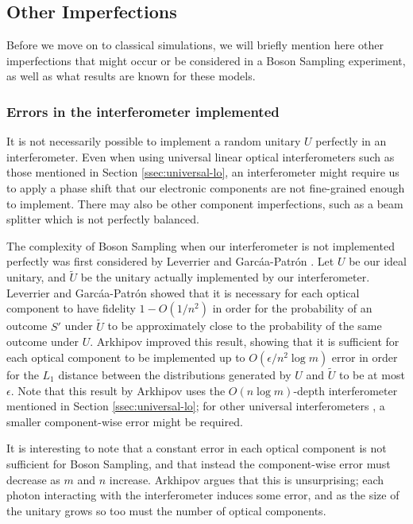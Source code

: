 \subsection{Other Imperfections}

Before we move on to classical simulations, we will briefly mention here other imperfections that might occur or be considered in a Boson Sampling experiment, as well as what results are known for these models.

\subsubsection{Errors in the interferometer implemented}

It is not necessarily possible to implement a random unitary $U$ perfectly in an interferometer. Even when using universal linear optical interferometers such as those mentioned in Section \ref{ssec:universal-lo}, an interferometer might require us to apply a phase shift that our electronic components are not fine-grained enough to implement. There may also be other component imperfections, such as a beam splitter which is not perfectly balanced.

The complexity of Boson Sampling when our interferometer is not implemented perfectly was first considered by Leverrier and Garc\'{a}a-Patr\'{o}n \cite{leverrier2015}. Let $U$ be our ideal unitary, and $\tilde{U}$ be the unitary actually implemented by our interferometer. Leverrier and Garc\'{a}a-Patr\'{o}n showed that it is necessary for each optical component to have fidelity $1-O(1/n^2)$ in order for the probability of an outcome $S'$ under $\tilde{U}$ to be approximately close to the probability of the same outcome under $U$. Arkhipov \cite{arkhipov2015} improved this result, showing that it is sufficient for each optical component to be implemented up to $O(\epsilon/n^2\log m)$ error in order for the $L_1$ distance between the distributions generated by $U$ and $\tilde{U}$ to be at most $\epsilon$. Note that this result by Arkhipov uses the $O(n\log m)$-depth interferometer mentioned in Section \ref{ssec:universal-lo}; for other universal interferometers \cite{hurwitz1897, reck1994, clements2016}, a smaller component-wise error might be required.

It is interesting to note that a constant error in each optical component is not sufficient for Boson Sampling, and that instead the component-wise error must decrease as $m$ and $n$ increase. Arkhipov argues that this is unsurprising; each photon interacting with the interferometer induces some error, and as the size of the unitary grows so too must the number of optical components.

